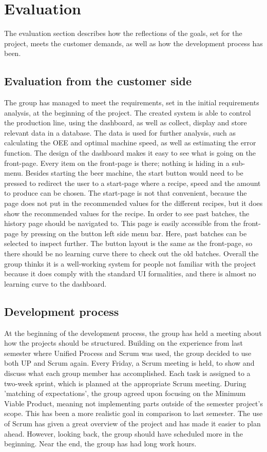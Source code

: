 \section{Evaluation}
The evaluation section describes how the reflections of the goals, set for the
project, meets the customer demands, as well as how the development process has
been.


\subsection{Evaluation from the customer side}
The group has managed to meet the requirements, set in the initial requirements
analysis, at the beginning of the project. The created system is able to control
the production line, using the dashboard, as well as collect, display and
store relevant data in a database. The data is used for further analysis, such
as calculating the OEE and optimal machine speed, as well as estimating the
error function.
The design of the dashboard makes it easy to see what is going on the front-page.
Every item on the front-page is there; nothing is hiding in a sub-menu.
Besides starting the beer machine, the start button would need to be pressed
to redirect the user to a start-page where a recipe, speed and the amount to
produce can be chosen. The start-page is not that convenient, because the page 
does not put in the recommended values for the different recipes, but it does
show the recommended values for the recipe.
In order to see past batches, the history page should be navigated to. This page
is easily accessible from the front-page by pressing on the button left
side menu bar. Here, past batches can be selected to inspect further. The button
layout is the same as the front-page, so there should be no learning curve there
to check out the old batches. Overall the group thinks it is a well-working
system for people not familiar with the project because it does comply with the
standard UI formalities, and there is almost no learning curve to the dashboard.


\subsection{Development process}
At the beginning of the development process, the group has held a meeting
about how the projects should be structured. Building on the experience from
last semester where Unified Process and Scrum was used, the group
decided to use both UP and Scrum again. Every Friday, a Scrum meeting is held,
to show and discuss what each group member has accomplished. Each task is
assigned to a two-week sprint, which is planned at the appropriate Scrum
meeting.
During 'matching of expectations', the group agreed upon focusing on the Minimum
Viable Product, meaning not implementing parts outside of the semester project's
scope. This has been a more realistic goal in comparison to last semester.
The use of Scrum has given a great overview of the project and has made it 
easier to plan ahead. However, looking back, the group should have scheduled 
more in the beginning. Near the end, the group has had long work hours.

